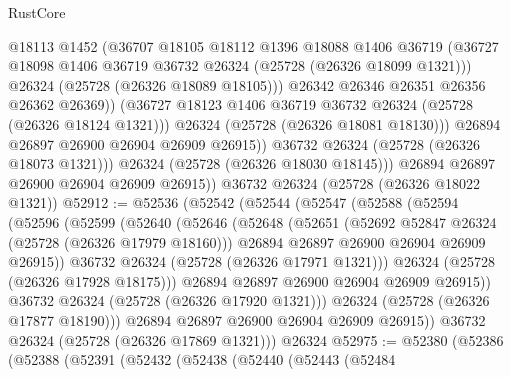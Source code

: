 \begin{lexlean}{RustCore}
\begin{coremodule}
                      @18113
                      @1452
                      (@36707
                        @18105
                        @18112
                        @1396
                        @18088
                        @1406
                        @36719
                        (@36727 @18098 @1406 @36719 @36732 @26324 (@25728 (@26326 @18099 @1321)))
                        @26324
                        (@25728 (@26326 @18089 @18105)))
                      @26342
                      @26346
                      @26351
                      @26356
                      @26362
                      @26369))
                  (@36727 @18123 @1406 @36719 @36732 @26324 (@25728 (@26326 @18124 @1321)))
                  @26324
                  (@25728 (@26326 @18081 @18130)))
                @26894
                @26897
                @26900
                @26904
                @26909
                @26915))
            @36732
            @26324
            (@25728 (@26326 @18073 @1321)))
          @26324
          (@25728 (@26326 @18030 @18145)))
        @26894
        @26897
        @26900
        @26904
        @26909
        @26915))
    @36732
    @26324
    (@25728 (@26326 @18022 @1321))
@52912 := @52536
    (@52542
      (@52544
        (@52547
          (@52588
            (@52594
              (@52596
                (@52599
                  (@52640
                    (@52646
                      (@52648
                        (@52651
                          (@52692 @52847 @26324 (@25728 (@26326 @17979 @18160)))
                          @26894
                          @26897
                          @26900
                          @26904
                          @26909
                          @26915))
                      @36732
                      @26324
                      (@25728 (@26326 @17971 @1321)))
                    @26324
                    (@25728 (@26326 @17928 @18175)))
                  @26894
                  @26897
                  @26900
                  @26904
                  @26909
                  @26915))
              @36732
              @26324
              (@25728 (@26326 @17920 @1321)))
            @26324
            (@25728 (@26326 @17877 @18190)))
          @26894
          @26897
          @26900
          @26904
          @26909
          @26915))
      @36732
      @26324
      (@25728 (@26326 @17869 @1321)))
    @26324
@52975 := @52380
    (@52386
      (@52388
        (@52391
          (@52432
            (@52438
              (@52440
                (@52443
                  (@52484

\end{coremodule}
\end{lexlean}
